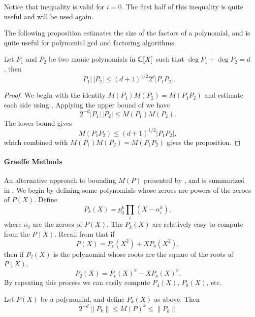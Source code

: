 Notice that inequality  is valid for $i = 0$.
The first half of this inequality is quite useful and will be used
again.

\medskip
The following proposition estimates the size of the factors of a
polynomial, and is quite useful for polynomial {\sc gcd} and factoring
algorithms.

\begin{proposition} [{\Gelfond}] \label{Factor:CBound:Prop}
Let $P_{1}$ and $P_{2}$ be two monic polynomials in $\mathbb{C}[X]$ such that
$\deg P_1 + \deg P_2 = d$, then
\[
\left|P_{1}\right|\, \left| P_{2}\right| 
  \le (d+1)^{1/2}2^{d}\left| P_{1} P_{2} \right|.
\]
\end{proposition}

\begin{proof}
We begin with the identity $M(P_{1}) M(P_{2}) = M(P_{1} P_{2})$ and
estimate each side using .  Applying the upper
bound of  we have
\[
2^{-d}\left|P_{1}\right| \,\left|P_{2}\right| \le M(P_{1})M(P_{2}).
\]
The lower bound gives
\[
M(P_{1} P_{2}) \le (d+1)^{1/2} \left| P_{1} P_{2}\right|,
\]
which combined with $M(P_{1}) M(P_{2}) = M(P_{1} P_{2})$ gives the
proposition.
\end{proof}

\paragraph{Graeffe Methods}

An alternative approach to bounding $M(P)$ presented by {\Cerlienco},
{\Mignotte} and {\Piras} \cite{Cerlienco87} is summarized in
.  We begin by defining some
polynomials whose zeroes are powers of the zeroes of $P(X)$.  Define
\[
P_k(X) = p_0^k \prod_i \left(X - \alpha_i^k\right),
\]
where $\alpha_i$ are the zeroes of $P(X)$.  The $P_k(X)$ are
relatively easy to compute from the $P(X)$.  Recall from
 that if
\[
P(X) = P_e(X^2) + X P_o(X^2),
\]
then if $P_2(X)$ is the polynomial whose roots are the square of the
roots of $P(X)$,
\[
P_2(X) = P_e(X)^2 - X P_o(X)^2.
\]
By repeating this process we can easily compute $P_4(X)$, $P_8(X)$, etc.  

\begin{proposition}  
\label{Graeffe:Bound:Prop}
Let $P(X)$ be a polynomial, and define
$P_k(X)$ as above.  Then
\[
2^{-d} \|P_k\| \le M(P)^k \le \|P_k\|
\]
\end{proposition}


